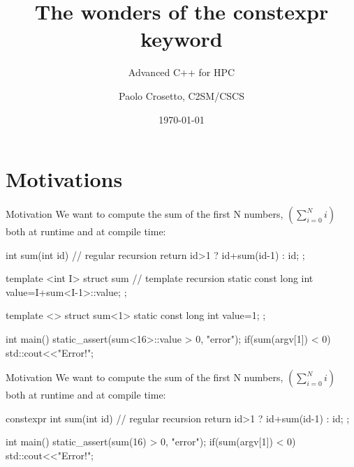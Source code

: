 \documentclass[aspectratio=43]{beamer}
\author{Paolo Crosetto, C2SM/CSCS}
\title{The wonders of the constexpr keyword}
\subtitle{Advanced C++ for HPC}
\date{\today}
\begin{document}
\cscstitle



\section{Motivations}


\begin{frame}[fragile]{Motivation}
  We want to compute the sum of the first N numbers, $\left(\sum_{i=0}^N i\right)$ both at runtime and at compile time:
  \begin{Cpplisting}{}
int sum(int id){ // regular recursion
    return id>1 ? id+sum(id-1) : id;
};

template <int I>
struct sum{ // template recursion
    static const long int value=I+sum<I-1>::value;
};

template <>
struct sum<1>{
    static const long int value=1;
};

int main(){
    static_assert(sum<16>::value > 0, "error");
    if(sum(argv[1]) < 0) std::cout<<"Error!\n";
}
\end{Cpplisting}
\end{frame}

  \begin{frame}[fragile]{Motivation}
  We want to compute the sum of the first N numbers, $\left(\sum_{i=0}^N i\right)$ both at runtime and at compile time:
  \begin{Cpplisting}{}
constexpr int sum(int id){ // regular recursion
    return id>1 ? id+sum(id-1) : id;
};











int main(){
    static_assert(sum(16) > 0, "error");
    if(sum(argv[1]) < 0) std::cout<<"Error!\n";
}
\end{Cpplisting}

\end{frame}
\end{document}
